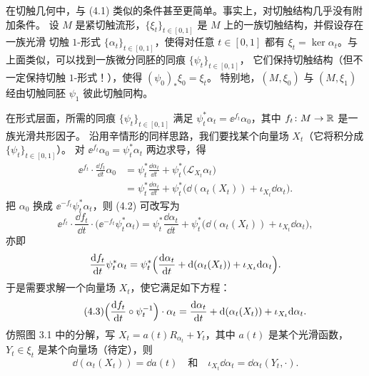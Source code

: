 在切触几何中，与 (4.1) 类似的条件甚至更简单。事实上，对切触结构几乎没有附加条件。
设 $M$ 是紧切触流形，$\{\xi_t\}_{t\in[0,1]}$ 是 $M$ 上的一族切触结构，并假设存在一族光滑
切触 $1$-形式 $\{\alpha_t\}_{t\in[0,1]}$，使得对任意 $t\in[0,1]$ 都有
$\xi_t=\ker\alpha_t$。与上面类似，可以找到一族微分同胚的同痕 $\{\psi_t\}_{t\in[0,1]}$，
它们保持切触结构（但不一定保持切触 $1$-形式！），使得 $(\psi_0)_*\xi_0=\xi_t$。
特别地，$(M,\xi_0)$ 与 $(M,\xi_1)$ 经由切触同胚 $\psi_1$ 彼此切触同构。

在形式层面，所需的同痕 $\{\psi_t\}_{t\in[0,1]}$ 满足
$\psi_t^*\alpha_t=\ee^{f_t}\alpha_0$，其中 $f_t\colon M\to\mathbb{R}$ 是一族光滑共形因子。
沿用辛情形的同样思路，我们要找某个向量场 $X_t$（它将积分成 $\{\psi_t\}_{t\in[0,1]}$）。
对 $\ee^{f_t}\alpha_0=\psi_t^*\alpha_t$ 两边求导，得
\begin{equation}\tag{4.2}
  \begin{aligned}
    \ee^{f_t}\cdot\frac{\dd f_t}{\dd t}\alpha_0
    &=\psi_t^*\frac{\dd\alpha_t}{\dd t}+\psi_t^*\bigl(\mathcal L_{X_t}\alpha_t\bigr)\\
    &=\psi_t^*\frac{\dd\alpha_t}{\dd t}
    +\psi_t^*\bigl(\dd(\alpha_t(X_t))+\iota_{X_t}\dd\alpha_t\bigr).
  \end{aligned}
\end{equation}
把 $\alpha_0$ 换成 $\ee^{-f_t}\psi_t^*\alpha_t$，则 (4.2) 可改写为
\begin{equation*}
  \ee^{f_t}\cdot\frac{\dd f_t}{\dd t}\cdot\bigl(\ee^{-f_t}\psi_t^*\alpha_t\bigr)
  =\psi_t^*\frac{\dd\alpha_t}{\dd t}
  +\psi_t^*\bigl(\dd(\alpha_t(X_t))+\iota_{X_t}\dd\alpha_t\bigr),
\end{equation*}
亦即
\begin{equation*}
  \frac{\mathrm{d} f_t}{\mathrm{d} t}\psi_t^*\alpha_t
  =\psi_t^*\Bigl(\frac{\mathrm{d}\alpha_t}{\mathrm{d} t}
  +\mathrm{d}(\alpha_t(X_t))+\iota_{X_t}\mathrm{d}\alpha_t\Bigr).
\end{equation*}
于是需要求解一个向量场 $X_t$，使它满足如下方程：
\begin{equation}\tag{4.3}
  \Bigl(\frac{\mathrm{d} f_t}{\mathrm{d} t}\circ\psi_t^{-1}\Bigr)\cdot\alpha_t
  =\frac{\mathrm{d}\alpha_t}{\mathrm{d} t}+\mathrm{d}(\alpha_t(X_t))+\iota_{X_t}\mathrm{d}\alpha_t.
\end{equation}
仿照图 3.1 中的分解，写 $X_t=a(t)R_{\alpha_t}+Y_t$，其中 $a(t)$ 是某个光滑函数，
$Y_t\in\xi_t$ 是某个向量场（待定），则
\begin{equation*}
  \dd(\alpha_t(X_t))=\dd a(t)
  \quad\text{和}\quad
  \iota_{X_t}\dd\alpha_t=\dd\alpha_t(Y_t,\cdot).
\end{equation*}


